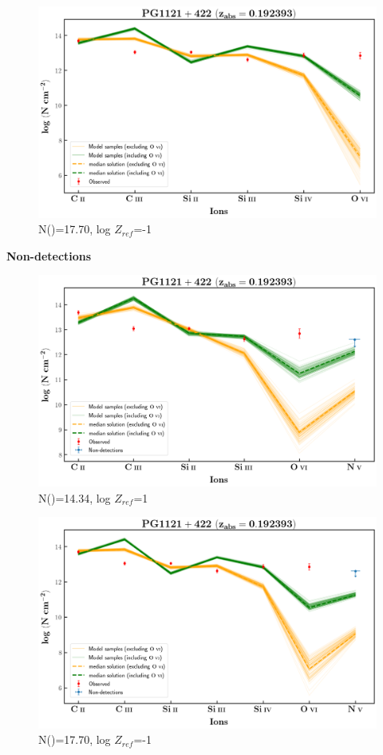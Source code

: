 \documentclass[12pt,draft]{report}
\newcommand\ion[2]{\text{#1\,\textsc{\lowercase{#2}}}}
\begin{document}
\newpage

\begin{figure}[!h]
    \centering
    \includegraphics[width=0.85\linewidth]{Ionisation-Modelling-Plots/pg1121-z=0.192393-compII.png}
    \caption{N(\ion{H}{i})=17.70, log $Z_{ref}$=-1}
\end{figure}


\newpage

\textbf{Non-detections}

\begin{figure}[!h]
    \centering
    \includegraphics[width=0.8\linewidth]{Ionisation-Modelling-Plots/pg1121-z=0.192393-compI_logZ=1_non_detection.png}
    \caption{N(\ion{H}{i})=14.34, log $Z_{ref}$=1}
\end{figure}

\begin{figure}[!h]
    \centering
    \includegraphics[width=0.8\linewidth]{Ionisation-Modelling-Plots/pg1121-z=0.192393-compII_logZ=-1_non_detection.png}
    \caption{N(\ion{H}{i})=17.70, log $Z_{ref}$=-1}
\end{figure}
\end{document}
